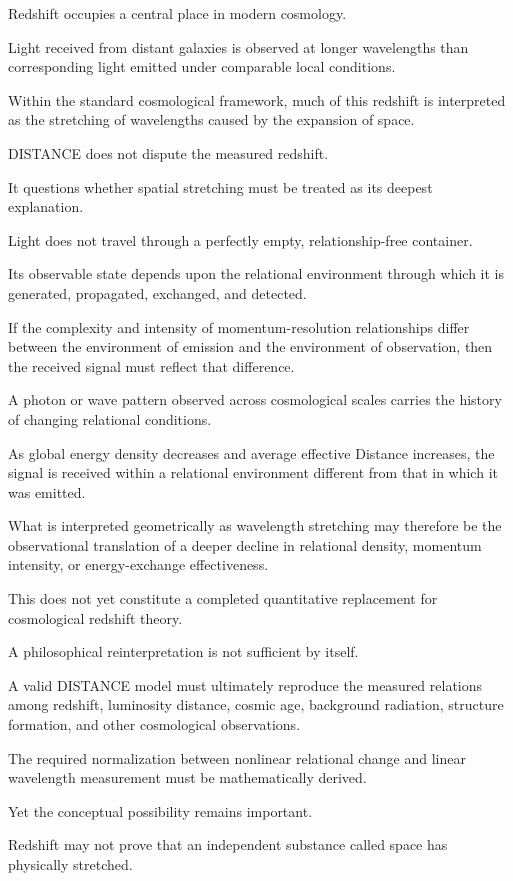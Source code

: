 Redshift occupies a central place in modern cosmology.

Light received from distant galaxies is observed at longer wavelengths than corresponding light emitted under comparable local conditions.

Within the standard cosmological framework, much of this redshift is interpreted as the stretching of wavelengths caused by the expansion of space.

DISTANCE does not dispute the measured redshift.

It questions whether spatial stretching must be treated as its deepest explanation.

Light does not travel through a perfectly empty, relationship-free container.

Its observable state depends upon the relational environment through which it is generated, propagated, exchanged, and detected.

If the complexity and intensity of momentum-resolution relationships differ between the environment of emission and the environment of observation, then the received signal must reflect that difference.

A photon or wave pattern observed across cosmological scales carries the history of changing relational conditions.

As global energy density decreases and average effective Distance increases, the signal is received within a relational environment different from that in which it was emitted.

What is interpreted geometrically as wavelength stretching may therefore be the observational translation of a deeper decline in relational density, momentum intensity, or energy-exchange effectiveness.

This does not yet constitute a completed quantitative replacement for cosmological redshift theory.

A philosophical reinterpretation is not sufficient by itself.

A valid DISTANCE model must ultimately reproduce the measured relations among redshift, luminosity distance, cosmic age, background radiation, structure formation, and other cosmological observations.

The required normalization between nonlinear relational change and linear wavelength measurement must be mathematically derived.

Yet the conceptual possibility remains important.

Redshift may not prove that an independent substance called space has physically stretched.


